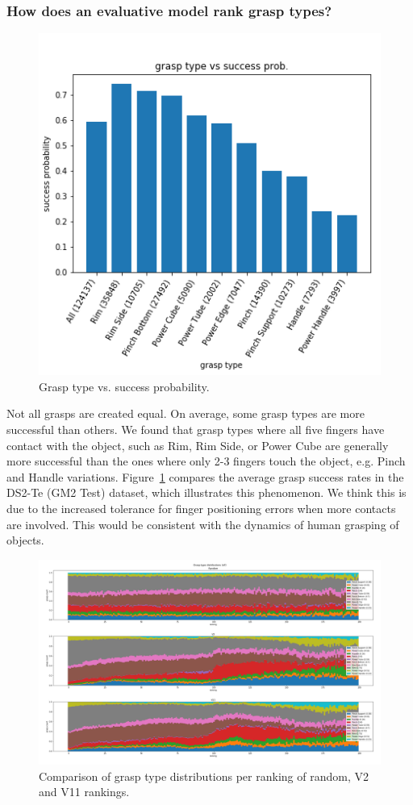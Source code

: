 \subsubsection{How does an evaluative model rank grasp types?}
\noindent


\begin{figure}
\centering 
\includegraphics[width=0.6\columnwidth]{images/post-analysis/Grasp_type_vs_success_prob.png}
\caption{Grasp type vs. success probability.}
\label{fig:post2}
\end{figure}

Not all grasps are created equal. On average, some grasp types are more successful than others. We found that grasp types where all five fingers have contact with the object, such as Rim, Rim Side, or Power Cube are generally more successful than the ones where only 2-3 fingers touch the object, e.g. Pinch and Handle variations. Figure~\ref{fig:post2} compares the average grasp success rates in the DS2-Te (GM2 Test) dataset, which illustrates this phenomenon. We think this is due to the increased tolerance for finger positioning errors when more contacts are involved. This would be consistent with the dynamics of human grasping of objects. 

\begin{figure}
\centering
\includegraphics[width=0.8\columnwidth]{images/post-analysis/Grasp_type_distributions_all.png}
\caption{Comparison of grasp type distributions per ranking of random, V2 and V11 rankings.}
\label{fig:post6}
\end{figure}

